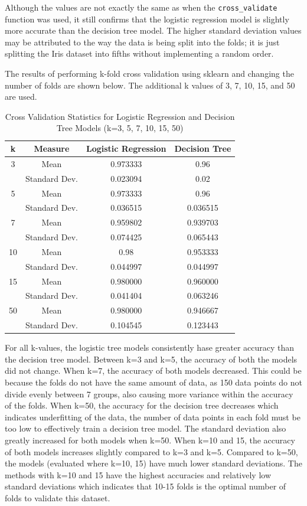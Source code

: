 \documentclass[journal]{IEEEtran}
\begin{document}
Although the values are not exactly the same as when the \lstinline{cross_validate} function was used, it still confirms that the logistic regression model is slightly more accurate than the decision tree model. The higher standard deviation values may be attributed to the way the data is being split into the folds; it is just splitting the Iris dataset into fifths without implementing a random order. 

The results of performing k-fold cross validation using sklearn and changing the number of folds are shown below. The additional k values of 3, 7, 10, 15, and 50 are used.

\begin{table}[h!]
\centering
\begin{tabular}{ c | c | c c }
k & Measure & Logistic Regression & Decision Tree \\
\hline
3 & Mean & 0.973333 & 0.96 \\
& Standard Dev.  & 0.023094 & 0.02 \\
\hline
5 & Mean & 0.973333 & 0.96 \\
& Standard Dev.  & 0.036515 & 0.036515 \\
 \hline
7 & Mean & 0.959802 & 0.939703 \\
 & Standard Dev.  & 0.074425 & 0.065443 \\
 \hline
10 & Mean & 0.98 & 0.953333 \\
 & Standard Dev.  & 0.044997 & 0.044997 \\
 \hline
15 & Mean&	0.980000&	0.960000 \\
&Standard Dev.&	0.041404&	0.063246 \\
\hline
50 & Mean &	0.980000 &	0.946667 \\
 & Standard Dev. &	0.104545 &	0.123443
\end{tabular}
\caption{Cross Validation Statistics for Logistic Regression and Decision Tree Models (k=3, 5, 7, 10, 15, 50)}
\label{table:MultiFoldCV}
\end{table}

For all k-values, the logistic tree models consistently hase greater accuracy than the decision tree model. Between k=3 and k=5, the accuracy of both the models did not change. When k=7, the accuracy of both models decreased. This could be because the folds do not have the same amount of data, as 150 data points do not divide evenly between 7 groups, also causing more variance within the accuracy of the folds. When k=50, the accuracy for the decision tree decreases which indicates underfitting of the data, the number of data points in each fold must be too low to effectively train a decision tree model. The standard deviation also greatly increased for both models when k=50. When k=10 and 15, the accuracy of both models increases slightly compared to k=3 and k=5. Compared to k=50, the models (evaluated where k=10, 15) have much lower standard deviations. The methods with k=10 and 15 have the highest accuracies and relatively low standard deviations which indicates that 10-15 folds is the optimal number of folds to validate this dataset.
\end{document}
